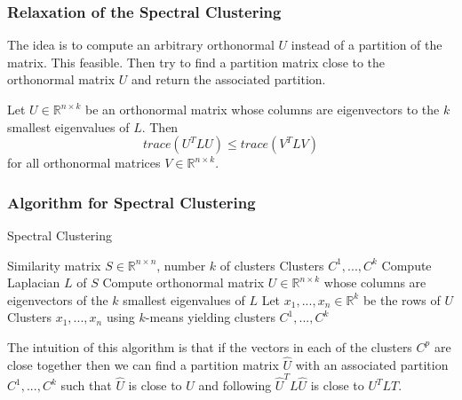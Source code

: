 \documentclass[english]{panikzettel}
\begin{document}
\subsubsection{Relaxation of the Spectral Clustering}
\begin{halfboxl}
\vspace{-\baselineskip}
	The idea is to compute an arbitrary orthonormal $U$ instead of a partition of the matrix. This feasible. Then try to find a partition matrix close to the orthonormal matrix $U$ and return the associated partition.
\end{halfboxl}
\begin{halfboxr}
\vspace{-\baselineskip}
	\begin{theo}{}
	Let $U\in\mathbb{R}^{n\times k}$ be an orthonormal matrix whose columns are eigenvectors to the $k$ smallest eigenvalues of $L$. Then
	\[
	trace(U^TLU)\leq trace(V^TLV)
	\]
	for all orthonormal matrices $V\in \mathbb{R}^{n\times k}$.
	\end{theo}
\end{halfboxr}

\subsubsection{Algorithm for Spectral Clustering}

\begin{halfboxl}
\vspace{-\baselineskip}
	\begin{algo}{Spectral Clustering}
	{
	\renewcommand{\algorithmicrequire}{\textbf{Input:}}
	\renewcommand{\algorithmicensure}{\textbf{Output:}}
	  \begin{algorithmic}[1]
	  \Require Similarity matrix $S\in\mathbb{R}^{n\times n}$, number $k$ of clusters
	  \Ensure Clusters $C^1,...,C^k$
	  \State Compute Laplacian $L$ of $S$
	  \State Compute orthonormal matrix $U\in\mathbb{R}^{n\times k}$ whose columns are eigenvectors of the $k$ smallest eigenvalues of $L$
	  \State Let $x_1,...,x_n\in\mathbb{R}^k$ be the rows of $U$
	  \State Clusters $x_1,...,x_n$ using $k$-means yielding clusters $C^1,...,C^k$
	  \end{algorithmic}
	}
	\end{algo}
\end{halfboxl}
\begin{halfboxr}
\vspace{-\baselineskip}
	The intuition of this algorithm is that if the vectors in each of the clusters $C^p$ are close together then we can find a partition matrix $\widehat{U}$ with an associated partition $C^1,...,C^k$ such that $\widehat{U}$ is close to $U$ and following $\widehat{U}^TL\widehat{U}$ is close to $U^TLT$.
\end{halfboxr}
\end{document}
